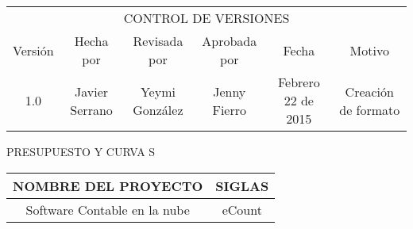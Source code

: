 %
\begin{table}[H]
	\centering
	\begin{tabular}{| c | c | c | c | c | c | }
	\hline
	\multicolumn{6}{c}{CONTROL DE VERSIONES} \\
	\cline{1-6}\noalign{\smallskip}
	\hline
	Versi\'on & Hecha por & Revisada por & Aprobada por & Fecha & Motivo \\ \hline
	 1.0 & Javier Serrano & Yeymi Gonz\'alez & Jenny Fierro & Febrero 22 de 2015 & Creaci\'on de formato \\
	\hline
	\end{tabular}
\end{table}
%
\begin{center}
	\huge{PRESUPUESTO Y CURVA S}
\end{center}
%
\begin{table}[H]
	\centering
	\begin{tabular}{| c | c |}
	\hline
	\textbf{NOMBRE DEL PROYECTO} & \textbf{SIGLAS} \\
	\hline
	Software Contable en la nube & eCount \\
	\hline
	\end{tabular}
\end{table}
%